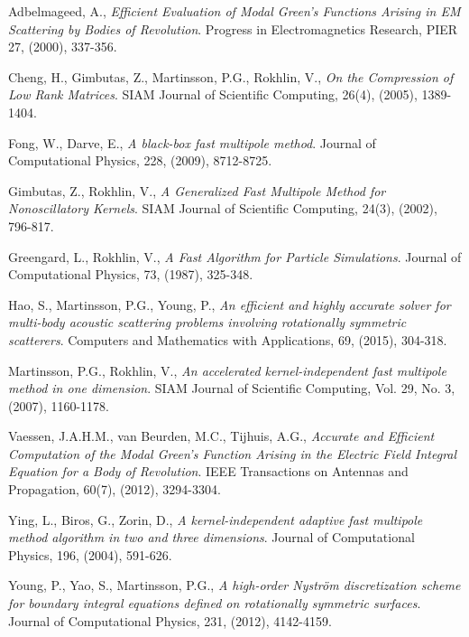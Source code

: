 \documentclass[11pt, oneside]{article}   	%
\begin{document}
\begin{thebibliography}{99}

 Adbelmageed, A., \emph{Efficient Evaluation of Modal Green's Functions Arising in EM Scattering by Bodies of Revolution}. Progress in Electromagnetics Research, PIER 27, (2000), 337-356.

 Cheng, H., Gimbutas, Z., Martinsson, P.G., Rokhlin, V., \emph{On the Compression of Low Rank Matrices}. SIAM Journal of Scientific Computing, 26(4), (2005), 1389-1404.

 Fong, W., Darve, E., \emph{A black-box fast multipole method}. Journal of Computational Physics, 228, (2009), 8712-8725.

 Gimbutas, Z., Rokhlin, V., \emph{A Generalized Fast Multipole Method for Nonoscillatory Kernels}. SIAM Journal of Scientific Computing, 24(3), (2002), 796-817.

 Greengard, L., Rokhlin, V., \emph{A Fast Algorithm for Particle Simulations}. Journal of Computational Physics, 73, (1987), 325-348.

 Hao, S., Martinsson, P.G., Young, P., \emph{An efficient and highly accurate solver for multi-body acoustic scattering problems involving rotationally symmetric scatterers}. Computers and Mathematics with Applications, 69, (2015), 304-318.

 Martinsson, P.G., Rokhlin, V., \emph{An accelerated kernel-independent fast multipole method in one dimension}. SIAM Journal of Scientific Computing, Vol. 29, No. 3, (2007), 1160-1178.

 Vaessen, J.A.H.M., van Beurden, M.C., Tijhuis, A.G., \emph{Accurate and Efficient Computation of the Modal Green's Function Arising in the Electric Field Integral Equation for a Body of Revolution}. IEEE Transactions on Antennas and Propagation, 60(7), (2012), 3294-3304.

 Ying, L., Biros, G., Zorin, D., \emph{A kernel-independent adaptive fast multipole method algorithm in two and three dimensions}. Journal of Computational Physics, 196, (2004), 591-626.

 Young, P., Yao, S., Martinsson, P.G., \emph{A high-order Nystr{\"o}m discretization scheme for boundary integral equations defined on rotationally symmetric surfaces}. Journal of Computational Physics, 231, (2012), 4142-4159.

\end{thebibliography}
\end{document}
